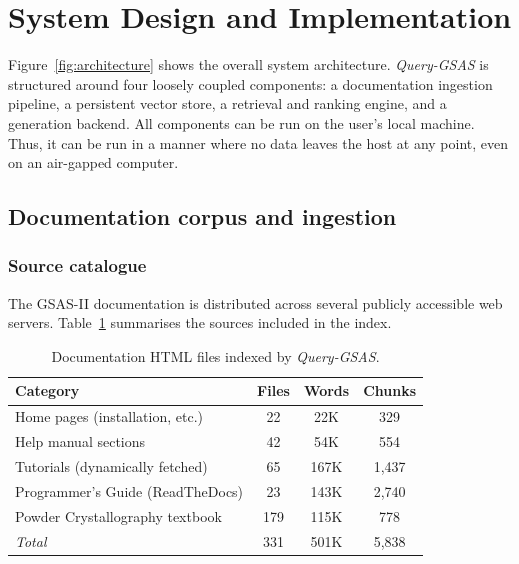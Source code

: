 \section{System Design and Implementation}
\label{sec:methods}

Figure~\ref{fig:architecture} shows the overall system architecture.
\textit{Query-GSAS} is structured around four loosely coupled components:
a documentation ingestion pipeline, a persistent vector store,
a retrieval and ranking engine, and a generation backend.
All components can be run on the user's local machine. Thus, it can be run in a manner where no data leaves the host at any point, even on an air-gapped computer.

\subsection{Documentation corpus and ingestion}
\label{sec:corpus}

\subsubsection{Source catalogue}

The GSAS-II documentation is distributed across several publicly accessible
web servers.
Table~\ref{tab:sources} summarises the sources included in the index.

\begin{table}[h]
  \centering
  \caption{Documentation HTML files indexed by \textit{Query-GSAS}.}
  \label{tab:sources}
  \begin{tabular}{lccc}
    \toprule
    Category & Files & Words & Chunks \\
    \midrule
    Home pages (installation, etc.)    & 22 & 22K & 329 \\
    Help manual sections               & 42 & 54K & 554 \\
    Tutorials (dynamically fetched)    & 65 & 167K & 1{,}437 \\
    Programmer's Guide (ReadTheDocs)   & 23 & 143K & 2{,}740 \\
    Powder Crystallography textbook    & 179 & 115K  & 778 \\
    \midrule
    \textit{Total}                     & 331 & 501K & 5{,}838 \\
    \bottomrule
  \end{tabular}
\end{table}


